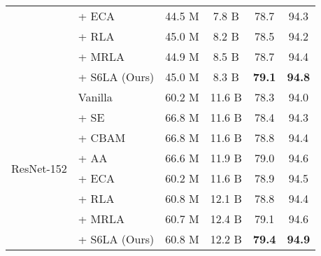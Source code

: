 \begin{table}[t]
\begin{center}
{\begin{tabular}{c|l|cc|cc}
    & + ECA \citep{wang2020eca} & 44.5 M & 7.8 B & 78.7 & 94.3 \\
    & + RLA \citep{zhao2021recurrence} & 45.0 M & 8.2 B & 78.5 & 94.2 \\
    & + MRLA \citep{fang2023cross} & 44.9 M & 8.5 B & 78.7 & 94.4 \\
    & + S6LA (Ours) & 45.0 M & 8.3 B & \textbf{79.1} & \textbf{94.8} \\
    \midrule
    \multirow{8}{*}{ResNet-152} & Vanilla \citep{he2016deep} & 60.2 M & 11.6 B & 78.3 & 94.0 \\
    & + SE \citep{hu2018squeeze} & 66.8 M & 11.6 B & 78.4 & 94.3 \\
    & + CBAM \citep{woo2018cbam} & 66.8 M & 11.6 B & 78.8 & 94.4 \\
    & + AA \citep{bello2019attention} & 66.6 M & 11.9 B & 79.0 & 94.6\\
    & + ECA \citep{wang2020eca} & 60.2 M & 11.6 B & 78.9 & 94.5 \\
    & + RLA \citep{zhao2021recurrence} & 60.8 M & 12.1 B & 78.8 & 94.4 \\
    & + MRLA \citep{fang2023cross} & 60.7 M & 12.4 B & 79.1 & 94.6 \\
    & + S6LA (Ours) & 60.8 M & 12.2 B & \textbf{79.4} & \textbf{94.9} \\
    \bottomrule
\end{tabular}
}
\end{center}
\vspace{-0.8cm}
\end{table}

